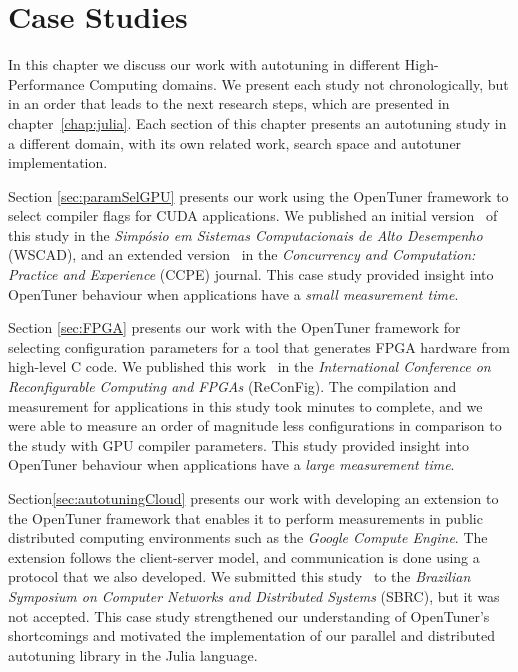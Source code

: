 \chapter{Case Studies}
\label{chap:usecases}

In this chapter we discuss our work with autotuning in different
High-Performance Computing domains. We present each study not chronologically,
but in an order that leads to the next research steps, which are presented in
chapter~\ref{chap:julia}. Each section of this chapter presents an autotuning
study in a different domain, with its own related work, search space and
autotuner implementation.

Section \ref{sec:paramSelGPU} presents our work using the OpenTuner framework
to select compiler flags for CUDA applications.  We published an initial
version~\cite{bruel2015autotuningGPU} of this study in the \textit{Simpósio em
Sistemas Computacionais de Alto Desempenho} (WSCAD), and an extended
version~\cite{bruel2017autotuning} in the \textit{Concurrency and Computation:
Practice and Experience} (CCPE) journal.  This case study provided insight into
OpenTuner behaviour when applications have a \textit{small measurement time}.

Section \ref{sec:FPGA} presents our work with the OpenTuner framework for
selecting configuration parameters for a tool that generates FPGA hardware from
high-level C code.  We published this work~\cite{bruel2017autotuninghls} in the
\textit{International Conference on Reconfigurable Computing and FPGAs}
(ReConFig).  The compilation and measurement for applications in this study
took minutes to complete, and we were able to measure an order of magnitude
less configurations in comparison to the study with GPU compiler parameters.
This study provided insight into OpenTuner behaviour when applications have a
\textit{large measurement time}.

Section\ref{sec:autotuningCloud} presents our work with developing an extension
to the OpenTuner framework that enables it to perform measurements in public
distributed computing environments such as the \textit{Google Compute Engine}.
The extension follows the client-server model, and communication is done using
a protocol that we also developed. We submitted this study~\cite{bruel2016new}
to the \textit{Brazilian Symposium on Computer Networks and Distributed
Systems} (SBRC), but it was not accepted. This case study strengthened our
understanding of OpenTuner's shortcomings and motivated the implementation
of our parallel and distributed autotuning library in the Julia language.

